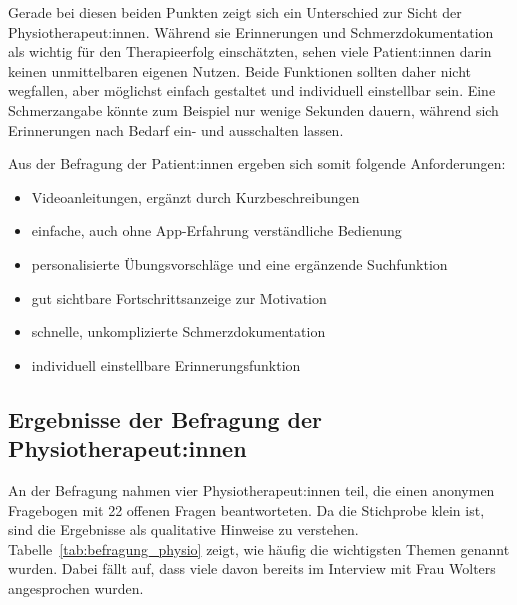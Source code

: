 Gerade bei diesen beiden Punkten zeigt sich ein Unterschied zur Sicht der
Physiotherapeut:innen. Während sie Erinnerungen und Schmerzdokumentation als
wichtig für den Therapieerfolg einschätzten, sehen viele Patient:innen darin
keinen unmittelbaren eigenen Nutzen. Beide Funktionen sollten daher nicht
wegfallen, aber möglichst einfach gestaltet und individuell einstellbar sein.
Eine Schmerzangabe könnte zum Beispiel nur wenige Sekunden dauern, während
sich Erinnerungen nach Bedarf ein- und ausschalten lassen.

Aus der Befragung der Patient:innen ergeben sich somit folgende Anforderungen:
\begin{itemize}
    \item Videoanleitungen, ergänzt durch Kurzbeschreibungen
    \item einfache, auch ohne App-Erfahrung verständliche Bedienung
    \item personalisierte Übungsvorschläge und eine ergänzende Suchfunktion
    \item gut sichtbare Fortschrittsanzeige zur Motivation
    \item schnelle, unkomplizierte Schmerzdokumentation
    \item individuell einstellbare Erinnerungsfunktion
\end{itemize}

\subsection{Ergebnisse der Befragung der Physiotherapeut:innen}

An der Befragung nahmen vier Physiotherapeut:innen teil, die einen anonymen Fragebogen mit 22 offenen Fragen beantworteten. Da die Stichprobe klein ist, sind die Ergebnisse als qualitative Hinweise zu verstehen. Tabelle~\ref{tab:befragung_physio} zeigt, wie häufig die wichtigsten Themen genannt wurden. Dabei fällt auf, dass viele davon bereits im Interview mit Frau Wolters angesprochen wurden.

